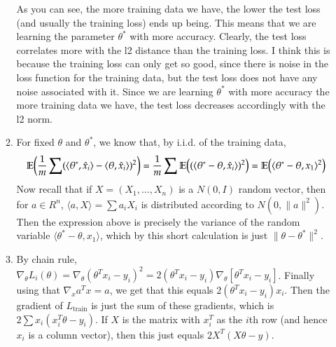 \documentclass[12pt]{article}
\theoremstyle{definitionstyle}
\newcommand{\mg}[1]{\| #1 \|}
\newcommand{\E}{\mathbb{E}\qty}
\renewcommand{\ip}[1]{\langle #1 \rangle}
\begin{document}
\begin{enumerate}[leftmargin=\labelsep]
\begin{enumerate}[label=(\alph*)]
\begin{table}
            \end{table}
            As you can see, the more training data we have, the lower the test loss (and usually the training loss) ends up being. This means that we are learning the parameter $\theta^*$ with more accuracy. Clearly, the test loss correlates more with the l2 distance than the training loss. I think this is because the training loss can only get so good, since there is noise in the loss function for the training data, but the test loss does not have any noise associated with it. Since we are learning $\theta^*$ with more accuracy the more training data we have, the test loss decreases accordingly with the l2 norm.

            \item For fixed $\theta$ and $\theta^*$, we know that, by i.i.d. of the training data,
            \begin{align*}
                \E(\frac 1m \sum (\ip{\theta^*, \hat x_i} - \ip{\theta, \hat x_i})^2) &= \frac 1m \sum \E((\ip{\theta^* - \theta, \hat x_i})^2) = \E(\ip{\theta^* - \theta, x_1}^2)\\
            \end{align*}
            Now recall that if $X = (X_1, \ldots, X_n)$ is a $N(0,I)$ random vector, then for $a \in R^n$, $\ip{a, X} = \sum a_iX_i$ is distributed according to $N(0, \mg{a}^2)$. Then the expression above is precisely the variance of the random variable $\ip{\theta^* - \theta, x_1}$, which by this short calculation is just $\mg{\theta - \theta^*}^2$. 

            \item By chain rule, $\nabla_\theta L_i(\theta) = \nabla_\theta (\theta^T x_i - y_i)^2 = 2(\theta^T x_i - y_i) \nabla_\theta [\theta^T x_i - y_i]$. Finally using that $\nabla_x a^Tx = a$, we get that this equals $2(\theta^T x_i - y_i) x_i$. Then the gradient of $L_{\text{train}}$ is just the sum of these gradients, which is $2 \sum x_i (x_i^T \theta - y_i)$. If $X$ is the matrix with $x_i^T$ as the $i$th row (and hence $x_i$ is a column vector), then this just equals $2X^T(X\theta - y)$. 


\end{enumerate}
\end{enumerate}
\end{document}
